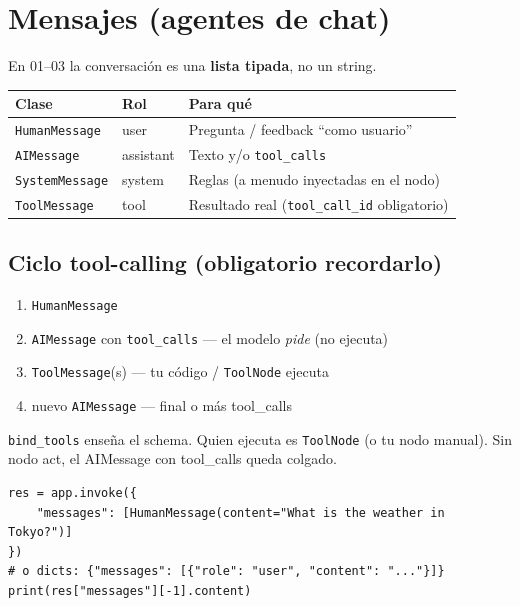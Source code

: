 \documentclass[11pt,a4paper]{article}
\begin{document}
\section{Mensajes (agentes de chat)}
\label{sec:messages}

En 01--03 la conversación es una \textbf{lista tipada}, no un string.

\begin{center}
\begin{tabular}{@{}llp{7.6cm}@{}}
\toprule
\textbf{Clase} & \textbf{Rol} & \textbf{Para qué} \\
\midrule
\texttt{HumanMessage} & user & Pregunta / feedback ``como usuario'' \\
\texttt{AIMessage} & assistant & Texto y/o \texttt{tool\_calls} \\
\texttt{SystemMessage} & system & Reglas (a menudo inyectadas en el nodo) \\
\texttt{ToolMessage} & tool & Resultado real (\texttt{tool\_call\_id} obligatorio) \\
\bottomrule
\end{tabular}
\end{center}

\subsection{Ciclo tool-calling (obligatorio recordarlo)}
\begin{enumerate}[leftmargin=*,itemsep=1pt]
  \item \texttt{HumanMessage}
  \item \texttt{AIMessage} con \texttt{tool\_calls} --- el modelo \emph{pide} (no ejecuta)
  \item \texttt{ToolMessage}(s) --- tu código / \texttt{ToolNode} ejecuta
  \item nuevo \texttt{AIMessage} --- final o más tool\_calls
\end{enumerate}

\begin{warn}[title=bind\_tools $\neq$ ejecutar]
\texttt{bind\_tools} enseña el schema. Quien ejecuta es \texttt{ToolNode} (o tu nodo manual).
Sin nodo act, el AIMessage con tool\_calls queda colgado.
\end{warn}

\begin{howto}[title=Arrancar un grafo de mensajes]
\begin{lstlisting}
res = app.invoke({
    "messages": [HumanMessage(content="What is the weather in Tokyo?")]
})
# o dicts: {"messages": [{"role": "user", "content": "..."}]}
print(res["messages"][-1].content)
\end{lstlisting}
\end{howto}
\end{document}
